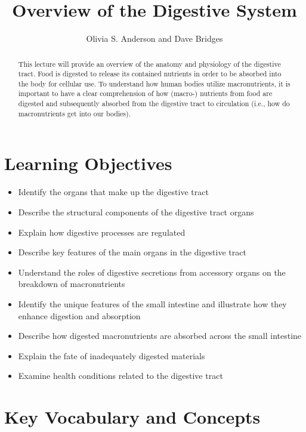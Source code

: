 \documentclass{tufte-handout}
\title{Overview of the Digestive System}
\author{Olivia S. Anderson and Dave Bridges}
\begin{document}
\maketitle%

\begin{abstract}
\noindent This lecture will provide an overview of the anatomy and physiology of the digestive tract. Food is digested to release its contained nutrients in order to be absorbed into the body for cellular use. To understand how human bodies utilize macronutrients, it is important to have a clear
comprehension of how (macro-) nutrients from food are digested and subsequently absorbed from the digestive tract to circulation (i.e., how do
macronutrients get into our bodies). 
\end{abstract}

\tableofcontents

\pagebreak
\section{Learning Objectives}

\begin{itemize}
\item Identify the organs that make up the digestive tract
\item Describe the structural components of the digestive tract organs
\item Explain how digestive processes are regulated
\item Describe key features of the main organs in the digestive tract
\item Understand the roles of digestive secretions from accessory organs on the breakdown of macronutrients
\item Identify the unique features of the small intestine and illustrate how they enhance digestion and absorption
\item Describe how digested macronutrients are absorbed across the small intestine
\item Explain the fate of inadequately digested materials
\item Examine health conditions related to the digestive tract

\end{itemize}

\section{Key Vocabulary and Concepts}
\end{document}
